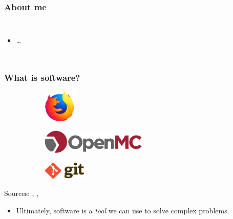 \begin{frame}
    \frametitle{About me}
    \begin{columns}
        \column[t]{5cm}
        \begin{itemize}
            \item \ldots
        \end{itemize}

    \end{columns}
\end{frame}

\begin{frame}
  \frametitle{What is software?}
  \begin{figure}[htpb]
      \centering
      \begin{subfigure}
        \centering
        \includegraphics[width=1.5cm]{images/firefox-logo.eps}
      \end{subfigure}
      \begin{subfigure}
        \centering
        \includegraphics[width=5cm]{images/openmc-logo.eps}
      \end{subfigure}
      \begin{subfigure}
        \centering
        \includegraphics[width=2cm]{images/git-logo.eps}
      \end{subfigure}
  \end{figure}
  \begin{center}
    {\tiny Sources: \cite{firefox_logo}, \cite{openmc_logo}, \cite{git_logo}}
  \end{center}
  \pause\medskip
  \begin{itemize}
      \item Ultimately, software is a {\it tool} we can use to solve complex problems.
  \end{itemize}
\end{frame}

